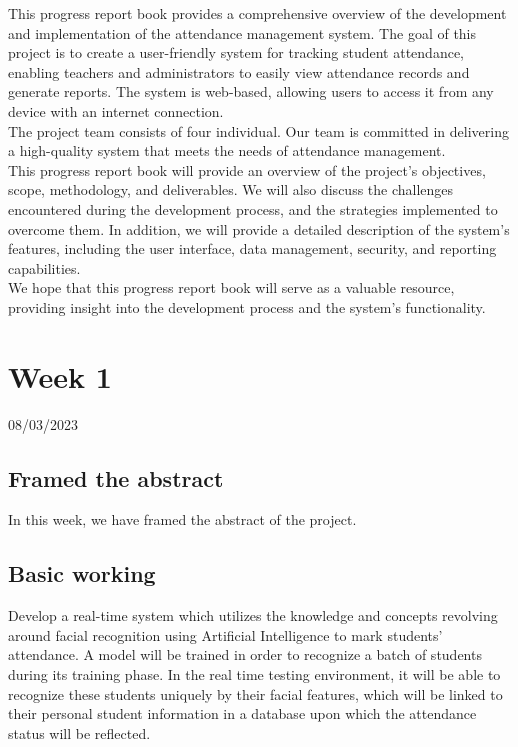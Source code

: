 \documentclass[12pt]{book}
\begin{document}
    \begin{flushleft}
    	This progress report book provides a comprehensive overview of the development and implementation of the attendance management system. The goal of this project is to create a user-friendly system for tracking student attendance, enabling teachers and administrators to easily view attendance records and generate reports. The system is web-based, allowing users to access it from any device with an internet connection. \\[6pt]
    	
    	The project team consists of four individual. Our team is committed in delivering a high-quality system that meets the needs of attendance management. \\[6pt]
    	
    	This progress report book will provide an overview of the project's objectives, scope, methodology, and deliverables. We will also discuss the challenges encountered during the development process, and the strategies implemented to overcome them. In addition, we will provide a detailed description of the system's features, including the user interface, data management, security, and reporting capabilities. \\[6pt]
    	
    	We hope that this progress report book will serve as a valuable resource, providing insight into the development process and the system's functionality.
    \end{flushleft}
    
    
    
    \tableofcontents


    \chapter{Week 1}
    \justifying
    \large
    08/03/2023
    
    
    \setcounter{page}{1}
    	
    \paragraph{}
    \section{Framed the abstract}
    In this week, we have framed the abstract of the project.  
    \section{Basic working}
    Develop a real-time system which utilizes
    the knowledge and concepts revolving around facial
    recognition using Artificial Intelligence to mark students’
    attendance. A model will be trained in order to recognize a
    batch of students during its training phase. In the real time
    testing environment, it will be able to recognize these
    students uniquely by their facial features, which will be linked
    to their personal student information in a database upon
    which the attendance status will be reflected. \\
    
\end{document}
